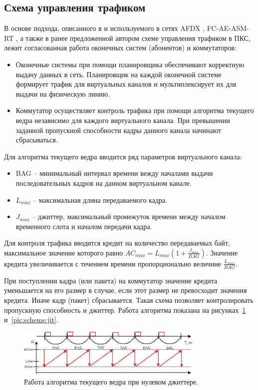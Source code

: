 \documentclass[12pt, a4paper]{article}
\begin{document}
\subsection{Схема управления трафиком}
В основе подхода, описанного в \cite{vdovin} и используемого в сетях AFDX \cite{afdx}, FC-AE-ASM-RT \cite{fcaert}, а также в ранее предложенной автором схеме управления трафиком в ПКС, лежит согласованная работа оконечных систем (абонентов) и коммутаторов:
\begin{itemize}
	\item Оконечные системы при помощи планировщика обеспечивают корректную выдачу данных в сеть. Планировщик на каждой оконечной системе формирует трафик для виртуальных каналов и мультиплексирует их для выдачи на физическую линию.
	\item Коммутатор осуществляет контроль трафика при помощи алгоритма текущего ведра независимо для каждого виртуального канала. При превышении заданной пропускной способности кадры данного канала начинают сбрасываться.
\end{itemize}


Для алгоритма текущего ведра вводится ряд параметров виртуального канала:
\begin{itemize}
	\item BAG -- минимальный интервал времени вежду началами выдачи последовательных кадров на данном виртуальном канале.
	\item $L_{max}$ -- максимальная длина передаваемого кадра.
	\item $J_{max}$ -- джиттер, максимальный промежуток времени между началом временного слота и началом передачи кадра.
\end{itemize}

Для контроля трафика вводится кредит на количество передаваемых байт, максимальное значение которого равно $AC_{max} = L_{max}(1 + \frac{J_{max}}{BAG})$. Значение
кредита увеличивается с течением времени пропорционально величине $\frac{L_{max}}{BAG}$.

При поступлении кадра (или пакета) на коммутатор значение кредита уменьшается на его размер в случае, если этот размер не превосходит значения кредита. Иначе кадр (пакет) сбрасывается. Такая схема позволяет контролировать пропускную способность и джиттер. Работа алгоритма показана на рисунках~\ref{pic:scheme:nojit} и~\ref{pic:scheme:jit}.

\begin{figure}[h!]
	\centering
	\includegraphics[width=0.80\textwidth]{img/nojit.png}
	\caption[russian]{Работа алгоритма текущего ведра при нулевом джиттере.}
	\label{pic:scheme:nojit}
\end{figure}
\end{document}

